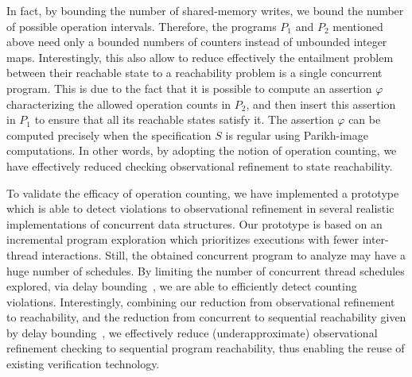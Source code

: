 In fact, by bounding the number of shared-memory writes, we bound the number of possible operation intervals. Therefore, the programs $P_1$ and $P_2$ mentioned above need only a bounded numbers of counters instead of unbounded integer maps. Interestingly, this also allow to reduce effectively the entailment problem between their reachable state to a reachability problem is a single concurrent program. This is due to the fact that it is possible to compute an assertion $\varphi$ characterizing the allowed operation counts in $P_2$, and then insert this assertion in $P_1$ to ensure that all its reachable states satisfy it. The assertion $\varphi$ can be computed precisely when the specification $S$ is regular using Parikh-image computations.  In other words, by adopting the notion of operation counting, we have effectively reduced checking observational refinement to state reachability.



To validate the efficacy of operation counting, we have implemented a prototype
which is able to detect violations to observational refinement in several
realistic implementations of concurrent data structures. Our prototype is based
on an incremental program exploration which prioritizes executions with fewer
inter-thread interactions. Still, the obtained concurrent program to analyze may have a huge number of schedules.
By limiting the number of concurrent thread schedules explored, via delay
bounding~\citep{ conf/popl/EmmiQR11}, we are able to efficiently detect
counting violations. Interestingly, combining our reduction from observational
refinement to reachability, and the reduction from concurrent to sequential
reachability given by delay bounding~\citep{ conf/popl/EmmiQR11}, we
effectively reduce (underapproximate) observational refinement checking to
sequential program reachability, thus enabling the reuse of existing
verification technology.

